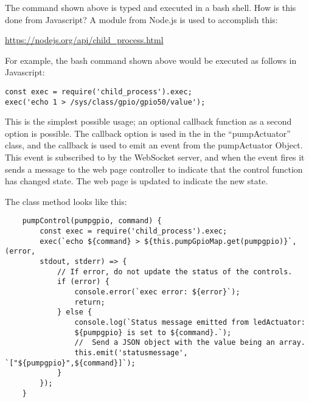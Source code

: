 The command shown above is typed and executed in a bash shell.  How is this 
done from Javascript?  A module from Node.js is used to accomplish this:

\url{https://nodejs.org/api/child_process.html}

For example, the bash command shown above would be executed as follows in 
Javascript:

\begin{verbatim}
const exec = require('child_process').exec;
exec('echo 1 > /sys/class/gpio/gpio50/value');
\end{verbatim}

This is the simplest possible usage; an optional callback function as a second 
option is possible.  The callback option is used in the in the ``pumpActuator'' 
class, and the callback is used to emit an event from the pumpActuator Object.  
This event is subscribed to by the WebSocket server, and when the event fires 
it sends a message to the web page controller to indicate that the control 
function has changed state.  The web page is updated to indicate the new state.

The class method looks like this:

\begin{verbatim}
    pumpControl(pumpgpio, command) {
        const exec = require('child_process').exec;
        exec(`echo ${command} > ${this.pumpGpioMap.get(pumpgpio)}`, (error, 
        stdout, stderr) => {
            // If error, do not update the status of the controls.
            if (error) {
                console.error(`exec error: ${error}`);
                return;
            } else {
                console.log(`Status message emitted from ledActuator: 
                ${pumpgpio} is set to ${command}.`);
                //  Send a JSON object with the value being an array.
                this.emit('statusmessage', `["${pumpgpio}",${command}]`);
            }
        });
    }
\end{verbatim}







